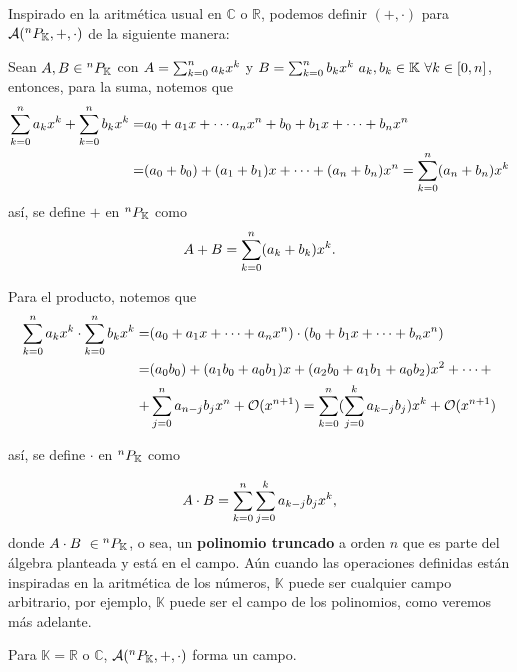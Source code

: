 Inspirado en la aritmética usual en $\mathbb{C}$ o $\mathbb{R}$, podemos definir $(+,\cdot)$ para $\mathcal{A}(^{n}P_{\mathbb{K}},+,\cdot)$ de la siguiente manera:

Sean $A,B \in {^{n}P_{\mathbb{K}}}$ con $A = \sum_{k=0}^n a_k x^k$ y $B = \sum_{k=0}^n b_k x^k \ a_k,b_k \in \mathbb{K} \ \forall k \in [0,n]$, entonces, para la suma, notemos que
\begin{align*}
\sum_{k=0}^n a_k x^k + \sum_{k=0}^n b_k x^k =& a_0 + a_1 x + \cdots a_n x^n + b_0 + b_1 x + \cdots + b_n x^n \\
=& (a_0 + b_0) + (a_1 + b_1) x + \cdots + (a_n + b_n)x^n = \sum_{k=0}^n (a_n + b_n) x^k 
\end{align*}
así, se define \textbf{$+$}  en ${^{n}P_{\mathbb{K}}}$ como
\begin{equation}
A + B = \sum_{k=0}^n (a_k + b_k) x^k.
\label{eq:polsum}
\end{equation}

Para el producto, notemos que
\begin{align*}
\sum_{k=0}^n a_k x^k\cdot\sum_{k=0}^n b_k x^k =& (a_0 + a_1 x + \cdots + a_n x^n)\cdot(b_0 + b_1 x + \cdots + b_n x^n) \\
=& (a_0b_0) + (a_1b_0 + a_0b_1) x + (a_2b_0 + a_1b_1 + a_0b_2) x^2 + \cdots + \\
+& \sum_{j=0}^n a_{n-j}b_j x^n + \mathcal{O}(x^{n+1}) = \sum_{k=0}^n  (\sum_{j=0}^k a_{k-j}b_j  )  x^k + \mathcal{O}(x^{n+1})
\end{align*}

así, se define \textbf{$\cdot$}  en ${^{n}P_{\mathbb{K}}}$ como

\begin{equation}
A \cdot B = \sum_{k=0}^n \sum_{j=0}^k a_{k-j}b_j x^k,
\label{eq:polprod}
\end{equation}
donde $ A \cdot B \ \in \pk$, o sea, un \textbf{polinomio truncado} a orden $n$ que es parte del álgebra planteada y está en el campo. Aún cuando las operaciones definidas están inspiradas en la aritmética de los números, $\mathbb{K}$ puede ser cualquier campo arbitrario, por ejemplo, $\mathbb{K}$ puede ser el campo de los polinomios, como veremos más adelante.

\begin{proposicion}
Para $\mathbb{K} = \mathbb{R}$ o $\mathbb{C}$, $\mathcal{A}(^{n}P_{\mathbb{K}},+,\cdot)$ forma un campo.
\label{prop:alg_field}
\end{proposicion}

